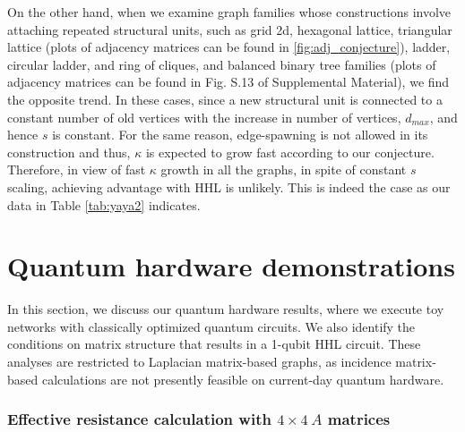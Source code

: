\documentclass[%
 reprint,
 superscriptaddress,
 amsmath,amssymb,
 aps,
 pra,
floatfix,
nofootinbib,
]{revtex4-2}
\theoremstyle{definition}
\theoremstyle{remark}
\begin{document}
On the other hand, when we examine graph families whose constructions involve attaching repeated structural units, such as grid 2d, hexagonal lattice, triangular lattice (plots of adjacency matrices can be found in \ref{fig:adj_conjecture}), ladder, circular ladder, and ring of cliques, and balanced binary tree families (plots of adjacency matrices can be found in Fig. S.13 of Supplemental Material), we find the opposite trend. In these cases, since a new structural unit is connected to a constant number of old vertices with the increase in number of vertices, $d_{max}$, and hence $s$ is constant. For the same reason, edge-spawning is not allowed in its construction and thus, $\kappa$ is expected to grow fast according to our conjecture. Therefore, in view of fast $\kappa$ growth in all the graphs, in spite of constant $s$ scaling, achieving advantage with HHL is unlikely. This is indeed the case as our data in Table \ref{tab:yaya2} indicates. 

\section{Quantum hardware demonstrations} \label{sec:hardware} 

In this section, we discuss our quantum hardware results, where we execute toy networks with classically optimized quantum circuits. We also identify the conditions on matrix structure that results in a 1-qubit HHL circuit. These analyses are restricted to Laplacian matrix-based graphs, as incidence matrix-based calculations are not presently feasible on current-day quantum hardware. 

\subsubsection{Effective resistance calculation with $4 \times 4\ A$ matrices} \label{app:ionq} 
\end{document}
